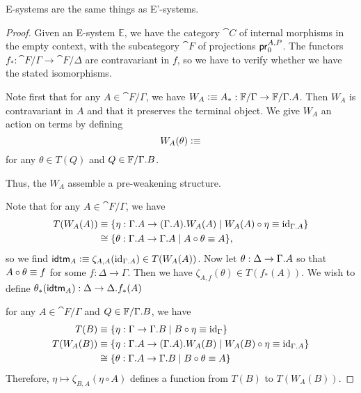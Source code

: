 \begin{thm}
E-systems are the same things as E'-systems.
\end{thm}

\begin{proof}
Given an E-system $\mathbb{E}$, we have the category $\cat{C}$ of internal
morphisms in the empty context, with the subcategory $\cat{F}$ of projections $\cprojfstf{A}{P}$. 
The functors $f_\ast:\cat{F}/\Gamma\to\cat{F}/\Delta$ are contravariant in
$f$, so we have to verify whether we have the stated isomorphisms.

Note first that for any $A\in\cat{F}/\Gamma$, we have
$W_A\defeq A_\ast:\cat{F}/\Gamma\to\cat{F}/\ctxext{\Gamma}{A}$. Then $W_A$ is
contravariant in $A$ and that it preserves the terminal object. We give $W_A$
an action on terms by defining
\begin{equation*}
W_A(\theta)\vcentcolon\equiv
\end{equation*}
for any $\theta\in T(Q)$ and $Q\in\cat{F}/\ctxext{\Gamma}{B}$. 

Thus, the $W_A$
assemble a pre-weakening structure.   

Note that for any $A\in\cat{F}/\Gamma$, we have
\begin{align*}
T(W_A(A)) & \jdeq \{\eta:\ctxext{\Gamma}{A}\to\ctxext{{\Gamma}{A}}{W_A(A)}\mid W_A(A)\circ\eta\jdeq\catid{\ctxext{\Gamma}{A}}\} \\
  & \cong
\{\theta:\ctxext{\Gamma}{A}\to\ctxext{\Gamma}{A}\mid A\circ\theta\jdeq A\},
\end{align*}
so we find $\idtm{A}\defeq\zeta_{A,A}(\catid{\ctxext{\Gamma}{A}})\in T(W_A(A))$.
Now let $\theta:\Delta\to\ctxext{\Gamma}{A}$ so that $A\circ\theta\equiv f$
for some $f:\Delta\to\Gamma$. Then we have $\zeta_{A,f}(\theta)\in T(f_\ast(A))$.  
We wish to define $\theta_\ast(\idtm{A}):\Delta\to\ctxext{\Delta}{f_\ast(A)}$

for any $A\in\cat{F}/\Gamma$ and $Q\in\cat{F}/\ctxext{\Gamma}{B}$, we have
\begin{align*}
T(B) 
  & \jdeq 
\{ \eta : \Gamma \to\ctxext{\Gamma}{B}
        \mid B\circ\eta\jdeq\catid{\Gamma}\}
  \\
T(W_A(B))
  & \jdeq
\{ \eta : \ctxext{\Gamma}{A}\to\ctxext{{\Gamma}{A}}{W_A(B)}
        \mid W_A(B)\circ\eta\jdeq\catid{\ctxext{\Gamma}{A}}\}
  \\
  & \cong
\{ \theta : \ctxext{\Gamma}{A}\to\ctxext{\Gamma}{B}\mid B\circ\theta\jdeq A\}
\end{align*}
Therefore, $\eta\mapsto \zeta_{B,A}(\eta\circ A)$ defines a function from
$T(B)$ to $T(W_A(B))$. 
\end{proof}


